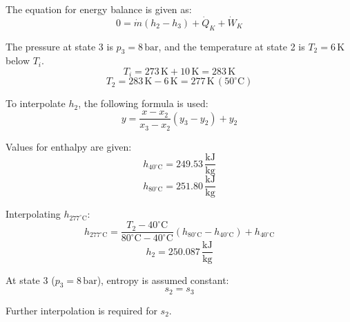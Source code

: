 The equation for energy balance is given as:  
\[
0 = \dot{m} (h_2 - h_3) + \dot{Q}_K + \dot{W}_K
\]

The pressure at state 3 is \(p_3 = 8 \, \text{bar}\), and the temperature at state 2 is \(T_2 = 6 \, \text{K}\) below \(T_i\).  
\[
T_i = 273 \, \text{K} + 10 \, \text{K} = 283 \, \text{K}
\]
\[
T_2 = 283 \, \text{K} - 6 \, \text{K} = 277 \, \text{K} \, (50^\circ\text{C})
\]

To interpolate \(h_2\), the following formula is used:  
\[
y = \frac{x - x_2}{x_3 - x_2} (y_3 - y_2) + y_2
\]

Values for enthalpy are given:  
\[
h_{40^\circ\text{C}} = 249.53 \, \frac{\text{kJ}}{\text{kg}}
\]
\[
h_{80^\circ\text{C}} = 251.80 \, \frac{\text{kJ}}{\text{kg}}
\]

Interpolating \(h_{277^\circ\text{C}}\):  
\[
h_{277^\circ\text{C}} = \frac{T_2 - 40^\circ\text{C}}{80^\circ\text{C} - 40^\circ\text{C}} (h_{80^\circ\text{C}} - h_{40^\circ\text{C}}) + h_{40^\circ\text{C}}
\]
\[
h_2 = 250.087 \, \frac{\text{kJ}}{\text{kg}}
\]

At state 3 (\(p_3 = 8 \, \text{bar}\)), entropy is assumed constant:  
\[
s_2 = s_3
\]

Further interpolation is required for \(s_2\).
